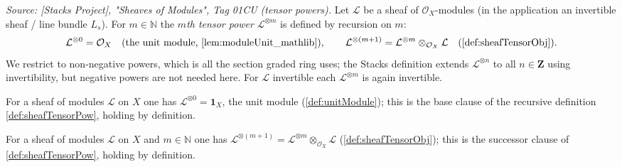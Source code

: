 \begin{definition}
  \label{def:sheafTensorPow}
  \textit{Source: [Stacks Project], "Sheaves of Modules", Tag 01CU (tensor
  powers).}
  Let \(\mathcal{L}\) be a sheaf of \(\mathcal{O}_X\)-modules (in the application
  an invertible sheaf / line bundle \(L_s\)). For \(m \in \mathbb{N}\) the
  \emph{\(m\)th tensor power} \(\mathcal{L}^{\otimes m}\) is defined by recursion
  on \(m\):
  \[
    \mathcal{L}^{\otimes 0} = \mathcal{O}_X
      \quad(\text{the unit module, \cref{lem:moduleUnit_mathlib}}),
    \qquad
    \mathcal{L}^{\otimes (m+1)}
      = \mathcal{L}^{\otimes m} \otimes_{\mathcal{O}_X} \mathcal{L}
        \quad(\cref{def:sheafTensorObj}).
  \]
  We restrict to non-negative powers, which is all the section graded ring uses;
  the Stacks definition extends \(\mathcal{L}^{\otimes n}\) to all
  \(n \in \mathbf{Z}\) using invertibility, but negative powers are not needed
  here. For \(\mathcal{L}\) invertible each \(\mathcal{L}^{\otimes m}\) is again
  invertible.
\end{definition}

\begin{lemma}
  \label{lem:tensorPow_zero}
  For a sheaf of modules \(\mathcal{L}\) on \(X\) one has
  \(\mathcal{L}^{\otimes 0} = \mathbf{1}_X\), the unit module
  (\cref{def:unitModule}); this is the base clause of the recursive definition
  \cref{def:sheafTensorPow}, holding by definition.
\end{lemma}

\begin{lemma}
  \label{lem:tensorPow_succ}
  For a sheaf of modules \(\mathcal{L}\) on \(X\) and \(m \in \mathbb{N}\) one has
  \(\mathcal{L}^{\otimes (m+1)} = \mathcal{L}^{\otimes m} \otimes_{\mathcal{O}_X}
  \mathcal{L}\) (\cref{def:sheafTensorObj}); this is the successor clause of
  \cref{def:sheafTensorPow}, holding by definition.
\end{lemma}

